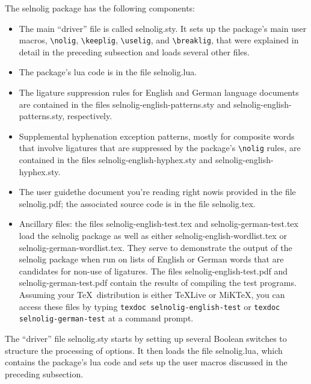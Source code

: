 \documentclass[11pt]{article}
\newcommand{\pkg}[1]{\textsf{#1}}
\newcommand{\cmmd}[1]{\texttt{\textbackslash #1}}
\begin{document}
The \pkg{selnolig} package has the following components:
\begin{itemize}
\item The main \enquote{driver} file is called \pkg{selnolig.sty}. It sets up the package's main user macros, \cmmd{nolig}, \cmmd{keeplig}, \cmmd{uselig}, and \cmmd{breaklig}, that were explained in detail in the preceding subsection and loads several other files.
\item The package's lua code is in the file \pkg{selnolig.lua}. 
\item The ligature suppression rules for English and German language documents are contained in the files \pkg{selnolig-english-patterns.sty} and \pkg{selnolig-english-patterns.sty}, respectively.
\item Supplemental hyphenation exception patterns, mostly for composite words that involve ligatures that are  suppressed by the package's \cmmd{nolig} rules, are contained in the files \pkg{selnolig-english-hyphex.sty} and \pkg{selnolig-english-hyphex.sty}.
\item The user guide\textemdash the document you're reading right now\textemdash is provided in the file \pkg{selnolig.pdf}; the associated source code is in the file \pkg{selnolig.tex}. 
\item Ancillary files: the files \pkg{selnolig-english-test.tex} and \pkg{selnolig-german-test.tex} load the \pkg{selnolig} package as well as either \pkg{selnolig-english-wordlist.tex} or \pkg{selnolig-german-wordlist.tex}. They serve to demonstrate the output of the \pkg{selnolig} package when run on lists of English or German words that are candidates for non-use of ligatures. The files \pkg{selnolig-english-test.pdf} and \pkg{selnolig-german-test.pdf} contain the results of compiling the test programs. 
Assuming your \TeX\ distribution is either \TeX Live or MiK\TeX, you can access these files by typing \Verb+texdoc selnolig-english-test+ or \Verb+texdoc selnolig-german-test+ at a command prompt. 
\end{itemize}

The \enquote{driver} file \pkg{selnolig.sty} starts by setting up several Boolean switches to structure the processing of options. It then loads the file \pkg{selnolig.lua}, which contains the package's lua code and sets up the user macros discussed in the preceding subsection. 
\end{document}
